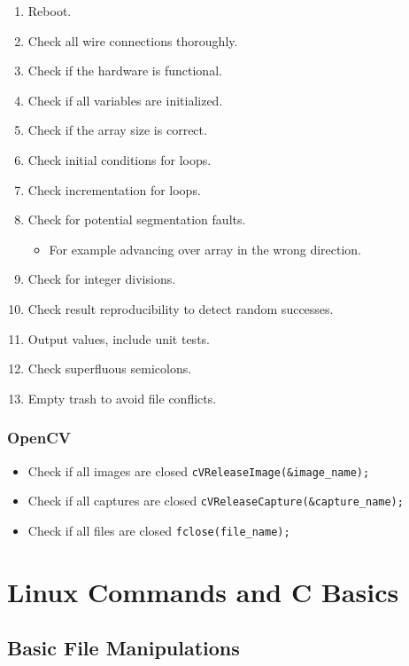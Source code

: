 \documentclass[10pt,a4paper]{scrartcl}
\begin{document}
\begin{multicols*}{2}
\begin{enumerate}
\item Reboot.
\item Check all wire connections thoroughly.
\item Check if the hardware is functional.
\item Check if all variables are initialized.
\item Check if the array size is correct.
\item Check initial conditions for loops.
\item Check incrementation for loops.
\item Check for potential segmentation faults.
\begin{itemize}
\item For example advancing over array in the wrong direction.
\end{itemize}
\item Check for integer divisions.
\item Check result reproducibility to detect random successes.
\item Output values, include unit tests.
\item Check superfluous semicolons.
\item Empty trash to avoid file conflicts.
\end{enumerate}

\subsubsection{OpenCV}

\begin{itemize}
\item Check if all images are closed \verb+cVReleaseImage(&image_name);+
\item Check if all captures are closed \verb+cVReleaseCapture(&capture_name);+
\item Check if all files are closed \verb+fclose(file_name);+
\end{itemize}

\section{Linux Commands and C Basics}

\subsection{Basic File Manipulations}


\end{multicols*}
\end{document}

